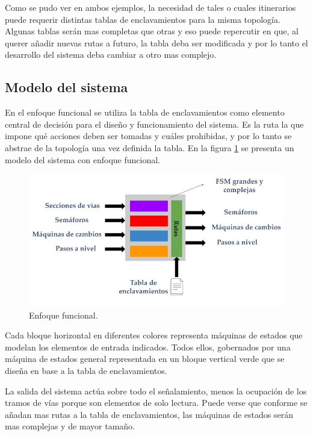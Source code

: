 		Como se pudo ver en ambos ejemplos, la necesidad de tales o cuales itinerarios puede requerir distintas tablas de enclavamientos para la misma topología. Algunas tablas serán mas completas que otras y eso puede repercutir en que, al querer añadir nuevas rutas a futuro, la tabla deba ser modificada y por lo tanto el desarrollo del sistema deba cambiar a otro mas complejo.
	
	\subsection{Modelo del sistema}
		
		En el enfoque funcional se utiliza la tabla de enclavamientos como elemento central de decisión para el diseño y funcionamiento del sistema. Es la ruta la que impone qué acciones deben ser tomadas y cuáles prohibidas, y por lo tanto se abstrae de la topología una vez definida la tabla.	En la figura \ref{fig:Modelo_Funcional} se presenta un modelo del sistema con enfoque funcional.
		
			\begin{figure}[h!]
			\centering
				\includegraphics[scale=.45]{./Figures/Funcional}
				\caption{Enfoque funcional.}
				\label{fig:Modelo_Funcional}
			\end{figure}
		
		\vspace{10cm}
		
		Cada bloque horizontal en diferentes colores representa máquinas de estados que modelan los elementos de entrada indicados. Todos ellos, gobernados por una máquina de estados general representada en un bloque vertical verde que se diseña en base a la tabla de enclavamientos. 	
		
		La salida del sistema actúa sobre todo el señalamiento, menos la ocupación de los tramos de vías porque son elementos de solo lectura. Puede verse que conforme se añadan mas rutas a la tabla de enclavamientos, las máquinas de estados serán mas complejas y de mayor tamaño.
	
